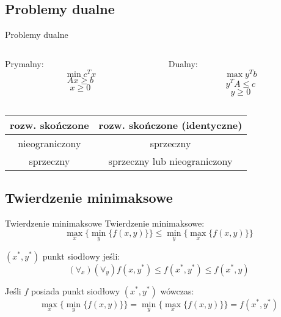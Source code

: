 \documentclass[xcolor=x11names,compress]{beamer}
\renewcommand{\(}{\begin{columns}}
\renewcommand{\)}{\end{columns}}
\newcommand{\<}[1]{\begin{column}{#1}}
\renewcommand{\>}{\end{column}}
\begin{document}
\subsection{Problemy dualne}
\begin{frame}{Problemy dualne}
\begin{columns}[c]
\begin{column}{.5\textwidth}
\begin{center}
Prymalny:
$$\min c^{T}x$$
$$Ax \geq b$$
$$x \geq 0$$
\end{center}
\end{column}
\begin{column}{.5\textwidth}
\begin{center}
Dualny:
$$\max y^{T}b$$
$$y^{T}A \leq c$$
$$y \geq 0$$
\end{center}
\end{column}
\end{columns}
\begin{center}
\begin{tabular}{ | c c | }
\hline
rozw. skończone & rozw. skończone (identyczne) \\
\hline
nieograniczony  & sprzeczny                    \\
\hline
sprzeczny       & sprzeczny lub nieograniczony \\
\hline
\end{tabular}
\end{center}
\end{frame}

\subsection{Twierdzenie minimaksowe}
\begin{frame}{Twierdzenie minimaksowe}
Twierdzenie minimaksowe:
$$\max_x \{ \min_{y} \{ f(x,y) \} \} \leq \min_{y} \{ \max_x \{ f(x,y) \} \}$$

$(x^*,y^*)$ punkt siodłowy jeśli:
$$(\forall_{x})(\forall_{y}) f(x,y^*) \leq f(x^*,y^*) \leq f(x^*,y)$$

Jeśli $f$ posiada punkt siodłowy $(x^*,y^*)$ wówczas:
$$\max_x \{ \min_{y} \{ f(x,y) \} \} = \min_{y} \{ \max_x \{ f(x,y) \} \} = f(x^*,y^*)$$
\end{frame}
\end{document}
